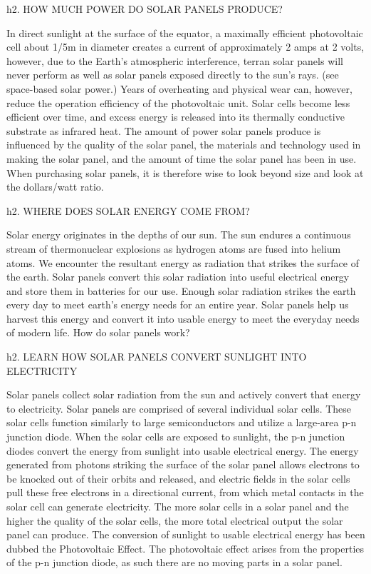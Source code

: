 h2. HOW MUCH POWER DO SOLAR PANELS PRODUCE?

In direct sunlight at the surface of the equator, a maximally efficient photovoltaic cell about 1/5m in diameter creates a current of approximately 2 amps at 2 volts, however, due to the Earth's atmospheric interference, terran solar panels will never perform as well as solar panels exposed directly to the sun's rays. (see space-based solar power.) 
Years of overheating and physical wear can, however, reduce the operation efficiency of the photovoltaic unit. Solar cells become less efficient over time, and excess energy is released into its thermally conductive substrate as infrared heat. 
The amount of power solar panels produce is influenced by the quality of the solar panel, the materials and technology used in making the solar panel, and the amount of time the solar panel has been in use. When purchasing solar panels, it is therefore wise to look beyond size and look at the dollars/watt ratio. 

h2. WHERE DOES SOLAR ENERGY COME FROM?

Solar energy originates in the depths of our sun. The sun endures a continuous stream of thermonuclear explosions as hydrogen atoms are fused into helium atoms. We encounter the resultant energy as radiation that strikes the surface of the earth. Solar panels convert this solar radiation into useful electrical energy and store them in batteries for our use. Enough solar radiation strikes the earth every day to meet earth's energy needs for an entire year. Solar panels help us harvest this energy and convert it into usable energy to meet the everyday needs of modern life.
How do solar panels work?

h2. LEARN HOW SOLAR PANELS CONVERT SUNLIGHT INTO ELECTRICITY

Solar panels collect solar radiation from the sun and actively convert that energy to electricity. Solar panels are comprised of several individual solar cells. These solar cells function similarly to large semiconductors and utilize a large-area p-n junction diode. When the solar cells are exposed to sunlight, the p-n junction diodes convert the energy from sunlight into usable electrical energy. The energy generated from photons striking the surface of the solar panel allows electrons to be knocked out of their orbits and released, and electric fields in the solar cells pull these free electrons in a directional current, from which metal contacts in the solar cell can generate electricity. The more solar cells in a solar panel and the higher the quality of the solar cells, the more total electrical output the solar panel can produce. The conversion of sunlight to usable electrical energy has been dubbed the Photovoltaic Effect. 
The photovoltaic effect arises from the properties of the p-n junction diode, as such there are no moving parts in a solar panel. 


